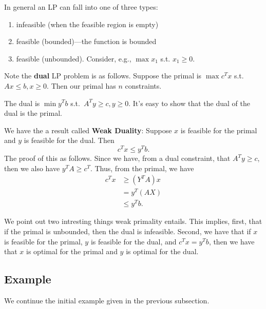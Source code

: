 \documentclass{article}
\begin{document}
In general an LP can fall into one of three types:
\begin{enumerate}
\item
infeasible (when the feasible region is empty)

\item
feasible (bounded)---the function is bounded

\item
feasible (unbounded). Consider, e.g., $\max x_1$ s.t. $x_1 \geq 0$.

\end{enumerate}



Note the \textbf{dual} LP problem is as follows.
Suppose the primal is $\max c^Tx$ s.t. $Ax \leq b, x\geq 0$.
Then our primal has $n$ constraints.

The dual is $\min y^T b$ s.t.\ $A^Ty \geq c, y \geq 0$.
It's easy to show that the dual of the dual is the primal.

We have the a result called \textbf{Weak Duality}:
Suppose $x$ is feasible for the primal and $y$ is feasible for the dual.
Then
$$
c^Tx \leq y^T b.
$$
The proof of this as follows.
Since we have, from a dual constraint, that $A^Ty \geq c$, then
we also have $y^TA \geq c^T$.
Thus, from the primal, we have 
\begin{align}
c^Tx &\geq (Y^TA)x \\
&= y^T(AX) \\
&\leq y^Tb.
\end{align}

We point out two intresting things weak primality entails.
This implies, first, that if the primal is unbounded, then the dual is 
infeasible.
Second, we have that if $x$ is feasible for the primal, $y$ is feasible
for the dual, and $c^Tx = y^Tb$, then we have that $x$ is optimal
for the primal and $y$ is optimal for the dual.

\subsection{Example}
We continue the initial example given in the previous subsection.
\end{document}
